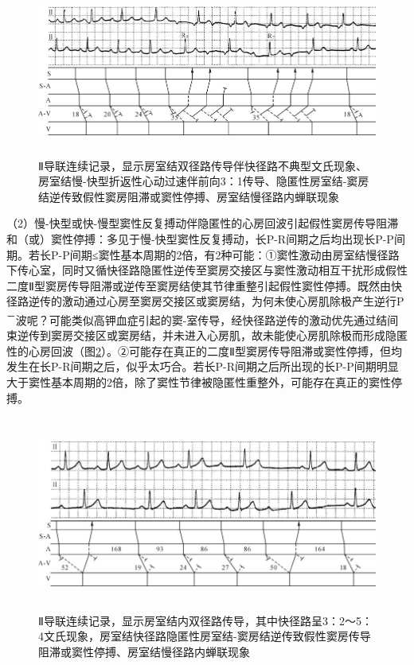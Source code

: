 \begin{figure}[!htbp]
 \centering
 \includegraphics[width=5.75in,height=2.1875in]{./images/Image00564.jpg}
 \captionsetup{justification=centering}
 \caption{Ⅱ导联连续记录，显示房室结双径路传导伴快径路不典型文氏现象、房室结慢-快型折返性心动过速伴前向3：1传导、隐匿性房室结-窦房结逆传致假性窦房阻滞或窦性停搏、房室结慢径路内蝉联现象}
 \label{fig35-11}
  \end{figure} 

（2）慢-快型或快-慢型窦性反复搏动伴隐匿性的心房回波引起假性窦房传导阻滞和（或）窦性停搏：多见于慢-快型窦性反复搏动，长P-R间期之后均出现长P-P间期。若长P-P间期≤窦性基本周期的2倍，有2种可能：①窦性激动由房室结慢径路下传心室，同时又循快径路隐匿性逆传至窦房交接区与窦性激动相互干扰形成假性二度Ⅱ型窦房传导阻滞或逆传至窦房结使其节律重整引起假性窦性停搏。既然由快径路逆传的激动通过心房至窦房交接区或窦房结，为何未使心房肌除极产生逆行P\textsuperscript{－}波呢？可能类似高钾血症引起的窦-室传导，经快径路逆传的激动优先通过结间束逆传到窦房交接区或窦房结，并未进入心房肌，故未能使心房肌除极而形成隐匿性的心房回波（图\ref{fig35-12}）。②可能存在真正的二度Ⅱ型窦房传导阻滞或窦性停搏，但均发生在长P-R间期之后，似乎太巧合。若长P-R间期之后所出现的长P-P间期明显大于窦性基本周期的2倍，除了窦性节律被隐匿性重整外，可能存在真正的窦性停搏。

\begin{figure}[!htbp]
 \centering
 \includegraphics[width=5.80208in,height=2.52083in]{./images/Image00565.jpg}
 \captionsetup{justification=centering}
 \caption{Ⅱ导联连续记录，显示房室结内双径路传导，其中快径路呈3：2～5：4文氏现象，房室结快径路隐匿性房室结-窦房结逆传致假性窦房传导阻滞或窦性停搏、房室结慢径路内蝉联现象}
 \label{fig35-12}
  \end{figure} 

